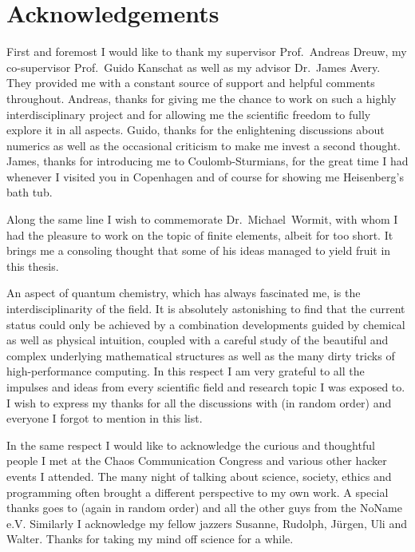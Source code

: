 \chapter*{Acknowledgements} 
{}

First and foremost I would like to thank
my supervisor Prof.~Andreas Dreuw,
my co-supervisor Prof.~Guido Kanschat
as well as my advisor Dr.~James Avery.
They provided me with a constant source of support
and helpful comments throughout.
Andreas, thanks for giving me the chance to work on such
a highly interdisciplinary project
and for allowing me the scientific freedom to fully explore it in all aspects.
Guido, thanks for the enlightening discussions about numerics
as well as the occasional criticism to make me invest a second thought.
James, thanks for introducing me to Coulomb-Sturmians,
for the great time I had whenever I visited you in Copenhagen
and of course for showing me Heisenberg's bath tub.

Along the same line I wish to commemorate Dr.~Michael~Wormit,
with whom I had the pleasure to work on the topic of finite elements,
albeit for too short.
It brings me a consoling thought that some of his
ideas managed to yield fruit in this thesis.


An aspect of quantum chemistry,
which has always fascinated me,
is the interdisciplinarity of the field.
It is absolutely astonishing
to find that the current status could only be achieved
by a combination developments guided by chemical as well as physical intuition,
coupled with a careful study of the beautiful and complex
underlying mathematical structures
as well as the many dirty tricks of high-performance computing.
In this respect I am very grateful
to all the impulses and ideas from
every scientific field and research topic I was exposed to.
I wish to express my thanks for all the discussions with
(in random order)
%
and everyone I forgot to mention in this list.


In the same respect I would like to acknowledge the curious and thoughtful
people I met at the Chaos Communication Congress
and various other hacker events I attended.
The many night of talking
about science, society, ethics and programming often brought a
different perspective to my own work.
A special thanks goes to 
(again in random order)
%
and all the other guys from the NoName e.V.
Similarly I acknowledge my fellow jazzers
Susanne, Rudolph, Jürgen, Uli and Walter.
Thanks for taking my mind off science for a while.


